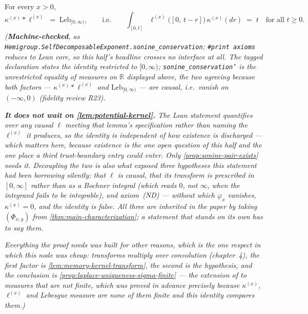 \begin{theorem}\label{thm:sonine-conservation}
\leanok
For every $x > 0$,
\[
  \kappa^{(x)} * \ell^{(x)} \;=\; \mathrm{Leb}_{[0,\infty)},
  \qquad \text{i.e.} \qquad
  \int_{[0,t]} \ell^{(x)}\bigl([0,\, t - r]\bigr)\,\kappa^{(x)}(dr) \;=\; t
  \quad \text{for all } t \ge 0.
\]
\statusT\quad\emph{(\textbf{Machine-checked}, as
\texttt{Hemigroup.SelfDecomposableExponent.sonine\_conservation}; \texttt{\#print axioms} reduces
to Lean core, so this half's headline crosses no interface at all. The tagged declaration states
the identity restricted to $[0,\infty)$; \texttt{sonine\_conservation'} is the unrestricted
equality of measures on $\mathbb{R}$ displayed above, the two agreeing because both factors ---
$\kappa^{(x)} * \ell^{(x)}$ and $\mathrm{Leb}_{[0,\infty)}$ --- are causal, i.e.\ vanish on
$(-\infty, 0)$ (fidelity review R23).}

\emph{\textbf{It does not wait on \ref{lem:potential-kernel}.} The Lean statement quantifies over
any causal $\ell$ meeting that lemma's specification rather than naming the $\ell^{(x)}$ it
produces, so the identity is independent of how existence is discharged --- which matters here,
because existence is the one open question of this half and the one place a third
trust-boundary entry could enter. Only \ref{prop:sonine-pair-exists} needs it. Decoupling the two
is also what exposed three hypotheses this statement had been borrowing silently: that $\ell$ is
causal, that its transform is prescribed in $[0,\infty]$ rather than as a Bochner integral
(which reads $0$, not $\infty$, when the integrand fails to be integrable), and axiom~(ND) ---
without which $\varphi_x$ vanishes, $\kappa^{(x)} = 0$, and the identity is \emph{false}. All
three are inherited in the paper by taking $(\Phi_{x,y})$ from
\ref{thm:main-characterization}; a statement that stands on its own has to say them.}

\emph{Everything the proof needs was built for other reasons, which is the one respect in which
this node was cheap: transforms multiply over convolution (chapter~4), the first factor is
\ref{lem:memory-kernel-transform}, the second is the hypothesis, and the conclusion is
\ref{prop:laplace-uniqueness-sigma-finite} --- the extension of  to measures that are
not finite, which was proved in advance precisely because $\kappa^{(x)}$, $\ell^{(x)}$ and
Lebesgue measure are none of them finite and this identity compares them.)}
\end{theorem}

